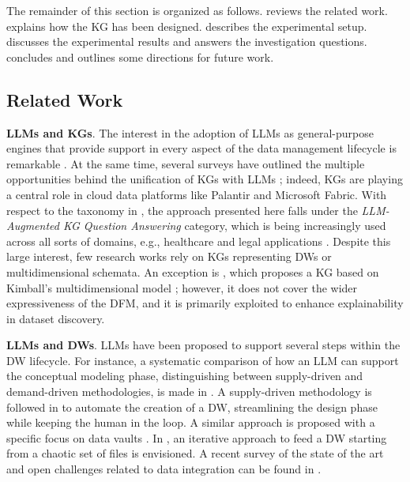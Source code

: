 The remainder of this section is organized as follows.  reviews the related work.  explains how the KG has been designed.  describes the experimental setup.  discusses the experimental results and answers the investigation questions.  concludes and outlines some directions for future work.

\subsection{Related Work}
\label{sec:llm-related}

\textbf{LLMs and KGs}. The interest in the adoption of LLMs as general-purpose engines that provide support in every aspect of the data management lifecycle is remarkable \cite{DBLP:journals/corr/abs-2505-18458,DBLP:journals/pvldb/LiZZ24}.
At the same time, several surveys have outlined the multiple opportunities behind the unification of KGs with LLMs \cite{DBLP:journals/tkde/PanLWCWW24,DBLP:journals/tgdk/PanRKSCDJO0LBMB23,DBLP:journals/tkde/JinLHJJH24}; indeed, KGs are playing a central role in cloud data platforms like Palantir and Microsoft Fabric. With respect to the taxonomy in \cite{DBLP:journals/tkde/PanLWCWW24}, the approach presented here falls under the \textit{LLM-Augmented KG Question Answering} category, which is being increasingly used across all sorts of domains, e.g., healthcare \cite{gao2025leveraging} and legal applications \cite{thenmozhi2025hierarchical}.
Despite this large interest, few research works rely on KGs representing DWs or multidimensional schemata. An exception is \cite{diamantini2025graph}, which proposes a KG based on Kimball's multidimensional model \cite{kimball1996data}; however, it does not cover the wider expressiveness of the DFM, and it is primarily exploited to enhance explainability in dataset discovery.

\textbf{LLMs and DWs}. LLMs have been proposed to support several steps within the DW lifecycle. For instance, a systematic comparison of how an LLM can support the conceptual modeling phase, distinguishing between supply-driven and demand-driven methodologies, is made in \cite{DBLP:journals/dke/RizziFGG25}. A supply-driven methodology is followed in \cite{abdelrahman2025dataforge} to automate the creation of a DW, streamlining the design phase while keeping the human in the loop. A similar approach is proposed with a specific focus on data vaults \cite{DBLP:journals/systems/VinesBB25}. In \cite{DBLP:journals/pvldb/RenenSK24}, an iterative approach to feed a DW starting from a chaotic set of files is envisioned. A recent survey of the state of the art and open challenges related to data integration can be found in \cite{DBLP:conf/dawak/Wrembel25}.

